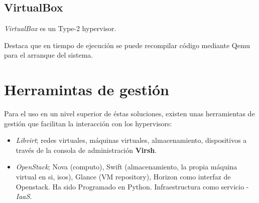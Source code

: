 \documentclass[11pt]{article}
\begin{document}
\subsection{VirtualBox}

\par \emph{VirtualBox} es un Type-2 hypervisor.

\par Destaca que en tiempo de ejecuci\'on se puede recompilar c\'odigo mediante Qemu para el arranque del sistema.

\section{Herramintas de gesti\'on}

\par Para el uso en un nivel superior de \'estas soluciones, existen unas herramientas de gesti\'on que facilitan la interacci\'on con los hypervisors:

\begin{itemize}
    \item \emph{Libvirt}; redes virtuales, m\'aquinas virtuales, almacenamiento, dispositivos a trav\'es de la consola de administraci\'on \textbf{Virsh}.
    \item \emph{OpenStack}; Nova (computo), Swift (almacenamiento, la propia m\'aquina virtual en si, isos), Glance (VM repository), Horizon como interfaz de Openstack. Ha sido Programado en Python. Infraestructura como servicio - \emph{IaaS}.
\end{itemize}
\end{document}
